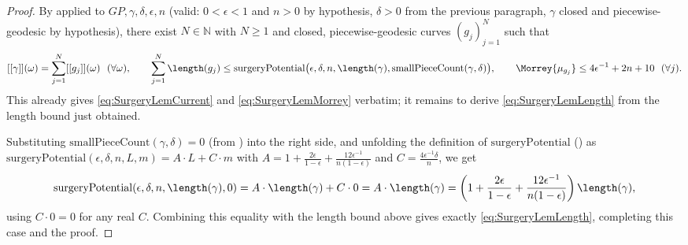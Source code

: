 \begin{proof}
  By  applied to $GP,\gamma,\delta,\epsilon,n$ (valid: $0<\epsilon<1$
  and $n>0$ by hypothesis, $\delta>0$ from the previous paragraph, $\gamma$ closed and
  piecewise-geodesic by hypothesis), there exist $N\in\mathbb{N}$ with $N\ge1$ and closed,
  piecewise-geodesic curves $(g_j)_{j=1}^N$ such that
  \[
    [[\gamma]](\omega)=\sum_{j=1}^N[[g_j]](\omega) \ \ (\forall\omega), \qquad
    \sum_{j=1}^N\length(g_j) \le \mathrm{surgeryPotential}\bigl(\epsilon,\delta,n,\length(\gamma),
    \mathrm{smallPieceCount}(\gamma,\delta)\bigr), \qquad
    \Morrey{\mu_{g_j}}\le4\epsilon^{-1}+2n+10 \ \ (\forall j)
    .
  \]
  This already gives \eqref{eq:SurgeryLemCurrent} and \eqref{eq:SurgeryLemMorrey} verbatim; it
  remains to derive \eqref{eq:SurgeryLemLength} from the length bound just obtained.

  Substituting $\mathrm{smallPieceCount}(\gamma,\delta)=0$ (from )
  into the right side, and unfolding the definition of $\mathrm{surgeryPotential}$
  () as
  $\mathrm{surgeryPotential}(\epsilon,\delta,n,L,m) = A\cdot L + C \cdot m$ with
  $A = 1+\tfrac{2\epsilon}{1-\epsilon}+\tfrac{12\epsilon^{-1}}{n(1-\epsilon)}$ and
  $C=\tfrac{4\epsilon^{-1}\delta}{n}$, we get
  \[
    \mathrm{surgeryPotential}(\epsilon,\delta,n,\length(\gamma),0) = A\cdot\length(\gamma) +
    C\cdot0 = A\cdot\length(\gamma) = \left(1+\frac{2\epsilon}{1-\epsilon}+
    \frac{12\epsilon^{-1}}{n(1-\epsilon)}\right)\length(\gamma)
    ,
  \]
  using $C\cdot0=0$ for any real $C$. Combining this equality with the length bound above gives
  exactly \eqref{eq:SurgeryLemLength}, completing this case and the proof.
\end{proof}
